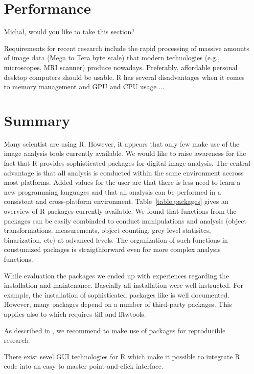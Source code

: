 \section{Performance}

Micha\l{}, would you like to take this section?


Requirements for recent research include the rapid processing of massive amounts 
of image data (Mega to Tera byte scale) that modern technologies (e.g., 
microscopes, MRI scanner) produce nowadays. Preferably, affordable personal desktop
computers should be usable. R has several disadvantages when it comes to memory management
and GPU and CPU usage ...

\section{Summary}

Many scientist are using R. However, it appears that only few make use of the 
image analysis tools currently available. We would like to raise awareness for 
the fact that R provides sophisticated packages for digital image analysis. The 
central advantage is that all analysis is conducted within the same environment 
accross most  platforms. Added values for the user are that there is less need 
to learn a new programming languages and that all analysis can be performed in a 
consistent and cross-platform environment. Table~\ref{table:packages} gives an 
overview of R packages currently available. We found that functions from the 
packages can be easily combinded to conduct manipulations and analysis (object 
transformations, measurements, object counting, grey level statisitcs, 
binarization, etc) at advanced levels. The organization of such functions in 
coustumized packages is straigthforward even for more complex analysis 
functions.

While evaluation the packages we ended up with experiences regarding the 
installation and maintenance. Bascially all installation were well instructed. 
For example, the installation of sophisticated packages like  is 
well documented. However, many packages depend on a number of third-party 
packages. This applies also to  which requires tiff and 
fftwtools.

As described in \citep{rodiger_r_2015}, we recommend to make use of packages for 
reproducible research. 

There exist sevel GUI technologies for R which make it possible to integrate 
R code into an easy to master point-and-click interface.


